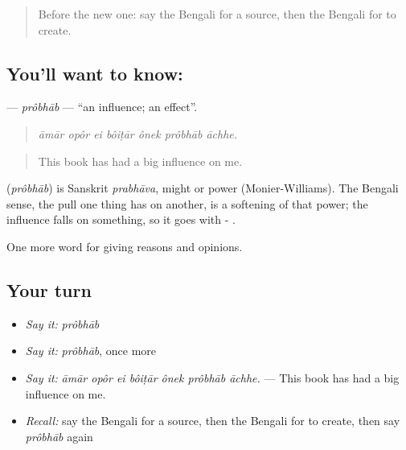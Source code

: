 \label{lesson:BN-C330-probhab}



\begin{quote}
Before the new one: say the Bengali for a source, then the Bengali for to create.
\end{quote}

\subsection*{You'll want to know: }
\textbf{} — \emph{prôbhāb} — \textquotedblleft{}an influence; an effect\textquotedblright{}.

\begin{quote}
      
\end{quote}

\begin{quote}
\emph{āmār opôr ei bôiṭār ônek prôbhāb āchhe.}
\end{quote}

\begin{quote}
This book has had a big influence on me.
\end{quote}

\begin{cousinweb}
\textbf{} (\emph{prôbhāb}) is Sanskrit \emph{prabhāva}, might or power (Monier-Williams). The Bengali sense, the pull one thing has on another, is a softening of that power; the influence falls on something, so it goes with - .
\end{cousinweb}

\begin{grammarlens}[title={What you've built}]
One more word for giving reasons and opinions.
\end{grammarlens}

\subsection*{Your turn}
\begin{itemize}
\raggedright
  \item \emph{Say it:} \emph{prôbhāb}
  \item \emph{Say it:} \emph{prôbhāb}, once more
  \item \emph{Say it:} \emph{āmār opôr ei bôiṭār ônek prôbhāb āchhe.} — This book has had a big influence on me.
  \item \emph{Recall:} say the Bengali for a source, then the Bengali for to create, then say \emph{prôbhāb} again
\end{itemize}

